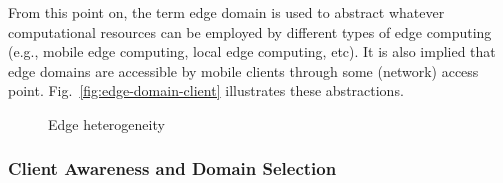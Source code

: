 From this point on, the term edge domain is used to abstract whatever computational resources can be employed by different types of edge computing (e.g., mobile edge computing, local edge computing, etc). It is also implied that edge domains are accessible by mobile clients through some (network) access point. Fig.~\ref{fig:edge-domain-client} illustrates these abstractions. 

\begin{figure}[htbp]
	\centering
	\captionsetup[subfigure]{width=0.5\textwidth}	
	\null\hfill
	\captionsetup[subfigure]{width=0.45\textwidth}	
	\hfill
	\hfill\null
	\caption{Edge heterogeneity}\label{fig:1}
\end{figure}


\subsubsection{Client Awareness and Domain Selection}

